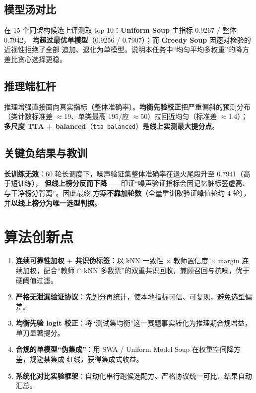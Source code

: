 \documentclass[11pt]{ctexart}
\newcommand{\kw}[1]{\textbf{#1}}
\begin{document}
\subsection{模型汤对比}
在 15 个同架构候选上评测取 top-10：\kw{Uniform Soup} 主指标 0.9267 / 整体 0.7942，
\kw{均超过最优单模型}（0.9256 / 0.7907）；而 \kw{Greedy Soup} 因逐对检验的近视性拒绝了全部
追加、退化为单模型。说明本任务中“均匀平均多权重”的降方差比贪心选择更稳。

\subsection{推理端杠杆}
推理增强直接面向真实指标（整体准确率）。\kw{均衡先验校正}把严重偏斜的预测分布（类计数标准差
$\approx$19、单类最高 195/应 $\approx$50）拉回近均匀（标准差 $\approx$1.4）；\kw{多尺度 TTA +
balanced}（\texttt{tta\_balanced}）是\kw{线上实测最大提分点}。

\subsection{关键负结果与教训}
\kw{长训练无效}：60 轮长调度下，噪声验证集整体准确率在退火尾段升至 0.7941（高于短训练），
\kw{但线上榜分反而下降}——印证“噪声验证指标会因记忆脏标签虚高、与干净榜分背离”。因此最终
方案\kw{不靠加轮数}（全量重训取验证峰值轮约 4 轮），并\kw{以线上榜分为唯一选型判据}。

\section{算法创新点}
\begin{enumerate}[leftmargin=2em,itemsep=2pt]
  \item \kw{连续可靠性加权 $+$ 共识伪标签}：以 kNN 一致性 $\times$ 教师置信度 $\times$ margin
        连续加权，配合“教师 $\cap$ kNN 多数票”的双重共识回收，兼顾召回与抗噪，优于硬阈值过滤。
  \item \kw{严格无泄漏验证协议}：先划分再统计，使本地指标可信、可复现，避免选型偏差。
  \item \kw{均衡先验 logit 校正}：将“测试集均衡”这一赛题事实转化为推理期合规增益，单刀显著提分。
  \item \kw{合规的单模型“伪集成”}：用 SWA / Uniform Model Soup 在权重空间降方差，规避禁集成
        红线，获得集成式收益。
  \item \kw{系统化对比实验框架}：自动化串行跑候选配方、严格协议统一可比、结果自动汇总。
\end{enumerate}
\end{document}
